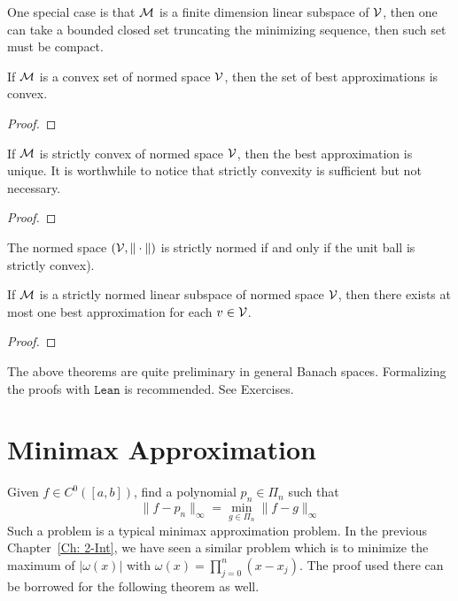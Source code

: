 One special case is that $\mathcal M$ is a finite dimension linear subspace of $\mathcal V$, then one can take a bounded closed set truncating the minimizing sequence, then such set must be compact.
\begin{lemma}[convexity]
\label{Lem: 4-CON}
If $\mathcal M$ is a convex set of normed space $\mathcal V$, then the set of best approximations is convex.
\end{lemma}
\begin{proof}
    
\end{proof}
\begin{theorem}[uniqueness]
\label{Thm: 4-Uni-1}
    If $\mathcal M$ is strictly convex of normed space $\mathcal V$, then the best approximation is unique. It is worthwhile to notice that strictly convexity is sufficient but not necessary.
\end{theorem}
\begin{proof}
    
\end{proof}
\begin{definition}
   The normed space $(\mathcal V, \|\cdot\|)$ is strictly normed if and only if the unit ball is strictly convex).
\end{definition}
\begin{theorem}[uniqueness]
\label{Thm: 4-Uni-2}
    If $\mathcal M$ is a strictly normed linear subspace of normed space $\mathcal V$, then there exists at most one best approximation for each $v\in\mathcal V$.
\end{theorem}
\begin{proof}
    
\end{proof}

\begin{remark}
    The above theorems are quite preliminary in general Banach spaces. Formalizing the proofs with $\texttt{Lean}$ is recommended. See Exercises.  
\end{remark}

\section{Minimax Approximation}
\label{Sec: 4-MIN-APP}
Given $f\in C^0([a, b])$, find a polynomial $p_n\in\Pi_n$ such that $$\|f - p_n\|_{\infty} = \min_{g\in\Pi_n} \|f - g\|_{\infty}$$
Such a problem is a typical minimax approximation problem. In the previous Chapter~\ref{Ch: 2-Int}, we have seen a similar problem which is to minimize the maximum of $|\omega(x)|$ with $\omega(x) = \prod_{j=0}^n(x - x_j)$. The proof used there can be borrowed for the following theorem as well. 

